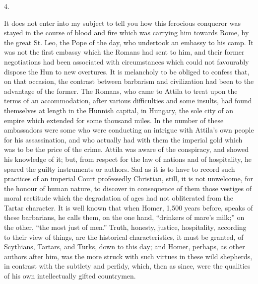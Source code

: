 4.

It does not enter into my
subject to tell you how this ferocious conqueror was stayed in the
course of blood and fire which was carrying him towards Rome, by
the great St. Leo, the Pope of the day, who undertook an embassy to
his camp. It was not the first embassy which the Romans had sent to
him, and their former negotiations had been associated with
circumstances which could not favourably dispose the Hun to new
overtures. It is melancholy to be obliged to confess that, on that
occasion, the contrast between barbarism and civilization had been to
the advantage of the former. The Romans, who came to Attila to treat
upon the terms of an accommodation, after various difficulties and
some insults, had found themselves at length in the Hunnish capital,
in Hungary, the sole city of an empire which extended for some
thousand miles. In the number of these ambassadors were some who were
conducting an intrigue with Attila's own people for his assassination,
and who actually had with them the imperial gold which was to be the
price of the crime. Attila was aware of the conspiracy, and showed his
knowledge of it; but, from respect for the law of nations and of
hospitality, he spared the guilty instruments or authors. Sad as it is
to have to record such practices of an imperial Court professedly
Christian, still, it is not unwelcome, for the honour of human nature,
to discover in consequence of them those vestiges of moral rectitude
which the degradation of ages had not obliterated from the Tartar
character. It is well known that when Homer, 1,500 years before,
speaks of these barbarians, he calls them, on the one hand, ``drinkers
of mare's milk;'' on the other, ``the most just of men.'' Truth, honesty,
justice, hospitality, according to their view of things, are the
historical characteristics, it must be granted, of Scythians, Tartars,
and Turks, down to this day; and Homer, perhaps, as other authors
after him, was the more struck with such virtues in these wild
shepherds, in contrast with the subtlety and perfidy, which, then as
since, were the qualities of his own intellectually gifted countrymen.

